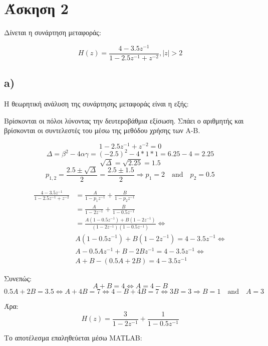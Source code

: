 \documentclass[11pt]{article}
\begin{document}
\section*{Άσκηση 2}
Δίνεται η συνάρτηση μεταφοράς:

$$H(z) = \frac{ 4 - 3.5z^{-1}}{1 - 2.5z^{-1} + z^{-2} } , |z| > 2$$

\subsection*{a)}
Η θεωρητική ανάλυση της συνάρτησης μεταφοράς είναι η εξής:
\par \noindent
Βρίσκονται οι πόλοι λύνοντας την δευτεροβάθμια εξίσωση.
Σπάει ο αριθμητής και βρίσκονται οι συντελεστές του μέσω της μεθόδου χρήσης των Α-Β.

\[ 1 - 2.5z^{-1} + z^{-2} = 0 \]
\[ Δ = β^2-4αγ = (-2.5)^2-4*1*1 = 6.25 - 4 = 2.25 \]
\[ \sqrt{Δ} = \sqrt{2.25} = 1.5 \]
\[ p_{1,2} = \frac{2.5 \pm \sqrt{Δ}}{2} = \frac{2.5\pm1.5}{2} \Rightarrow p_1=2 \quad \textrm{and} \quad p_2=0.5 \]


\begin{align*}
    \frac{4-3.5z^{-1}}{1-2.5z^{-1}+z^{-2}} &= \frac{A}{1-p_{1}z^{-1}} + \frac{B}{1-p_{2}z^{-1}} \\
    &=\frac{A}{1-2z^{-1}} + \frac{B}{1-0.5z^{-1}} \\
    &=\frac{A(1-0.5z^{-1}) + B(1-2z^{-1})}{(1-2z^{-1})(1-0.5z^{-1})} \Leftrightarrow \\
    & A(1-0.5z^{-1}) + B(1-2z^{-1})=4-3.5z^{-1} \Leftrightarrow \\
    & A - 0.5Az^{-1} + B -2Bz^{-1} = 4 -3.5z^{-1} \Leftrightarrow \\
    & A + B - (0.5A + 2B) = 4 -3.5z^{-1}
\end{align*}

\par \noindent
Συνεπώς:
\[ A+B=4 \Leftrightarrow A=4-B \]
\[ 0.5A+2B=3.5 \Leftrightarrow  A+4B=7 \Leftrightarrow  4-B+4B=7 \Leftrightarrow  3B=3 \Rightarrow  B=1 \quad \textrm{and} \quad  A=3 \]

\par \noindent
Άρα:
$$H(z) =\frac{3}{1-2z^{-1}} + \frac{1}{1-0.5z^{-1}} $$ 

\par \noindent
Το αποτέλεσμα επαληθεύεται μέσω MATLAB:
\end{document}
